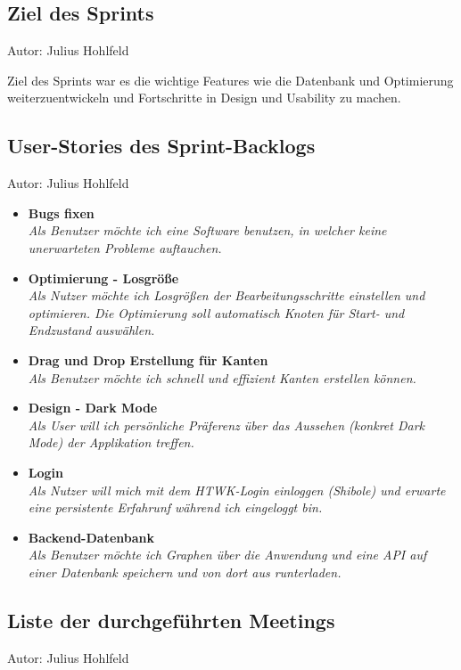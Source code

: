 \subsection{Ziel des Sprints}
{\small Autor: Julius Hohlfeld}

Ziel des Sprints war es die wichtige Features wie die Datenbank und Optimierung weiterzuentwickeln und Fortschritte in Design und Usability zu machen.\\

\subsection{User-Stories des Sprint-Backlogs}
{\small Autor: Julius Hohlfeld}

\begin{itemize}
  \item \textbf{Bugs fixen}
        \\\textit{Als Benutzer möchte ich eine Software benutzen, in welcher keine unerwarteten Probleme auftauchen.}
  \item \textbf{ Optimierung - Losgröße }
        \\\textit{
        Als Nutzer möchte ich Losgrößen der Bearbeitungsschritte einstellen und optimieren. Die Optimierung soll automatisch Knoten für Start- und Endzustand auswählen.}
  \item \textbf{Drag und Drop Erstellung für Kanten }
        \\\textit{
          Als Benutzer möchte ich schnell und effizient Kanten erstellen können.}
  \item \textbf{Design - Dark Mode}
        \\\textit{
          Als User will ich persönliche Präferenz über das Aussehen (konkret Dark Mode) der Applikation treffen.}
  \item \textbf{Login}
        \\\textit{
          Als Nutzer will mich mit dem HTWK-Login einloggen (Shibole) und erwarte eine persistente Erfahrunf während ich eingeloggt bin.}
  \item \textbf{Backend-Datenbank}
        \\\textit{
          Als Benutzer möchte ich Graphen über die Anwendung und eine API auf einer Datenbank speichern und von dort aus runterladen.}
\end{itemize}

\subsection{Liste der durchgeführten Meetings}
{\small Autor: Julius Hohlfeld}


